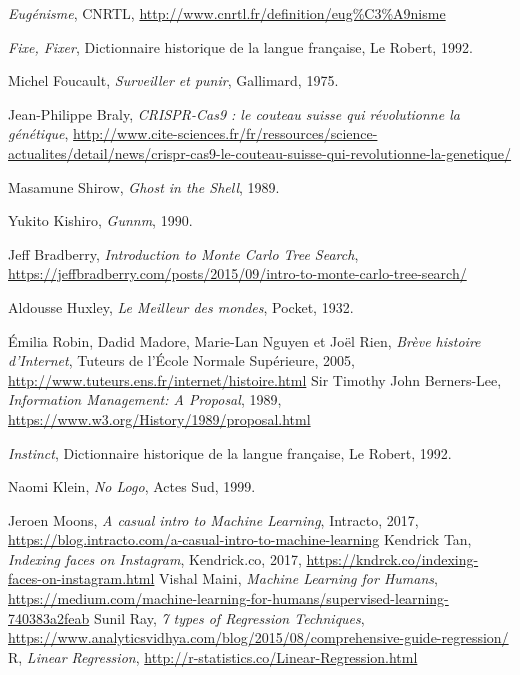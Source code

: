 \begin{thebibliography}{99}
     \emph{Eugénisme}, CNRTL, \url{http://www.cnrtl.fr/definition/eug%C3%A9nisme}

     \emph{Fixe, Fixer}, Dictionnaire historique de la langue française, Le Robert, 1992. 

     Michel Foucault, \emph{Surveiller et punir}, Gallimard, 1975.

     Jean-Philippe Braly, \emph{CRISPR-Cas9 : le couteau suisse qui révolutionne la génétique}, \url{http://www.cite-sciences.fr/fr/ressources/science-actualites/detail/news/crispr-cas9-le-couteau-suisse-qui-revolutionne-la-genetique/}

     Masamune Shirow, \emph{Ghost in the Shell}, 1989.

     Yukito Kishiro, \emph{Gunnm}, 1990.

     Jeff Bradberry, \emph{Introduction to Monte Carlo Tree Search}, \url{https://jeffbradberry.com/posts/2015/09/intro-to-monte-carlo-tree-search/}

     Aldousse Huxley, \emph{Le Meilleur des mondes}, Pocket, 1932.

     Émilia Robin, Dadid Madore, Marie-Lan Nguyen et Joël Rien, \emph{Brève histoire d'Internet}, Tuteurs de l'École Normale Supérieure, 2005, \url{http://www.tuteurs.ens.fr/internet/histoire.html}
     Sir Timothy John Berners-Lee, \emph{Information Management: A Proposal}, 1989, \url{https://www.w3.org/History/1989/proposal.html}
    
     \emph{Instinct}, Dictionnaire historique de la langue française, Le Robert, 1992. 

     Naomi Klein, \emph{No Logo}, Actes Sud, 1999.

     Jeroen Moons, \emph{A casual intro to Machine Learning}, Intracto, 2017, \url{https://blog.intracto.com/a-casual-intro-to-machine-learning}
     Kendrick Tan, \emph{Indexing faces on Instagram}, Kendrick.co, 2017, \url{https://kndrck.co/indexing-faces-on-instagram.html}
     Vishal Maini, \emph{Machine Learning for Humans}, \url{https://medium.com/machine-learning-for-humans/supervised-learning-740383a2feab}
     Sunil Ray, \emph{7 types of Regression Techniques}, \url{https://www.analyticsvidhya.com/blog/2015/08/comprehensive-guide-regression/}
     R, \emph{Linear Regression}, \url{http://r-statistics.co/Linear-Regression.html}
    

\end{thebibliography}
